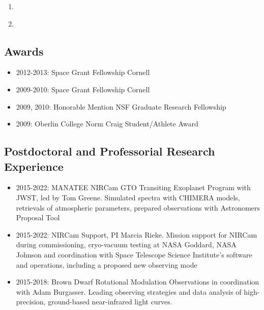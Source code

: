\documentclass[11pt, oneside]{article}   	%
\begin{document}
\begin{enumerate}[noitemsep]
\item \citet{baka2021peeringThroughDebris}
\item \citet{glidic2022corot1}
\end{enumerate}


%
%

\vspace{-0.15in}
\subsection*{Awards}
\begin{itemize}[noitemsep]
        \item 2012-2013: Space Grant Fellowship Cornell
        \item 2009-2010: Space Grant Fellowship Cornell
        \item 2009, 2010: Honorable Mention NSF Graduate Research Fellowship 
        \item 2009: Oberlin College Norm Craig Student/Athlete Award
\end{itemize}

\subsection*{Postdoctoral and Professorial Research Experience}
\begin{itemize}[noitemsep]
	\item 2015-2022: MANATEE NIRCam GTO Transiting Exoplanet Program with JWST, led by Tom Greene. Simulated spectra with CHIMERA models, retrievals of atmospheric parameters, prepared observations with Astronomers Proposal Tool
	\item 2015-2022: NIRCam Support, PI Marcia Rieke. Mission support for NIRCam during commissioning, cryo-vacuum testing at NASA Goddard, NASA Johnson and coordination with Space Telescope Science Institute's software and operations, including a proposed new observing mode
	\item 2015-2018: Brown Dwarf Rotational Modulation Observations in coordination with Adam Burgasser. Leading observing strategies and data analysis of high-precision, ground-based near-infrared light curves.
\end{itemize}
\end{document}
